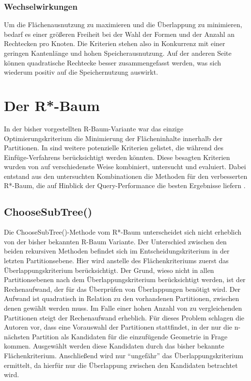 \documentclass[runningheads,a4paper]{llncs}
\begin{document}

	\subsubsection{Wechselwirkungen} %
	\label{ssub:wechselwirkungen}

	Um die Flächenausnutzung zu maximieren und die Überlappung zu minimieren, bedarf es einer größeren Freiheit bei der Wahl der Formen und der Anzahl an Rechtecken pro Knoten. Die Kriterien stehen also in Konkurrenz mit einer geringen Kantenlänge und hohen Speicherausnutzung. Auf der anderen Seite können quadratische Rechtecke besser zusammengefasst werden, was sich wiederum positiv auf die Speichernutzung auswirkt. \citep[vgl.][323-324]{Beckmann:1990}



\section{Der R*-Baum} %
\label{sec:rstar_tree}

	In der bisher vorgestellten R-Baum-Variante war das einzige Optimierungskriterium die Minimierung der Flächeninhalte innerhalb der Partitionen. In  sind weitere potenzielle Kriterien gelistet, die während des Einfüge-Verfahrens berücksichtigt werden könnten. Diese besagten Kriterien wurden von \Textcite{Beckmann:1990} auf verschiedenste Weise kombiniert, untersucht und evaluiert. Dabei entstand aus den untersuchten Kombinationen die Methoden für den verbesserten R*-Baum, die auf Hinblick der Query-Performance die besten Ergebnisse liefern \citep[vgl.][329]{Beckmann:1990}.

	\subsection{ChooseSubTree()}
	Die ChooseSubTree()-Methode vom R*-Baum unterscheidet sich nicht erheblich von der bisher bekannten R-Baum Variante. Der Unterschied zwischen den beiden rekursiven Methoden befindet sich im Entscheidungskriterium in der letzten Partitionsebene. Hier wird anstelle des Flächenkriteriums zuerst das Überlappungskriterium berücksichtigt. Der Grund, wieso nicht in allen Partitionsebenen nach dem Überlappungskriterium berücksichtigt werden, ist der Rechenaufwand, der für das Überprüfen von Überlappungen benötigt wird. Der Aufwand ist quadratisch in Relation zu den vorhandenen Partitionen, zwischen denen gewählt werden muss. Im Falle einer hohen Anzahl von zu vergleichenden Partitionen steigt der Rechenaufwand erheblich. Für dieses Problem schlagen die Autoren vor, dass eine Vorauswahl der Partitionen stattfindet, in der nur die n-nächsten Partition als Kandidaten für die einzufügende Geometrie in Frage kommen. Ausgewählt werden diese Kandidaten durch das bisher bekannte Flächenkriterium. Anschließend wird nur \enquote{ungefähr} das Überlappungskriterium ermittelt, da hierfür nur die Überlappung zwischen den Kandidaten betrachtet wird.
\end{document}
